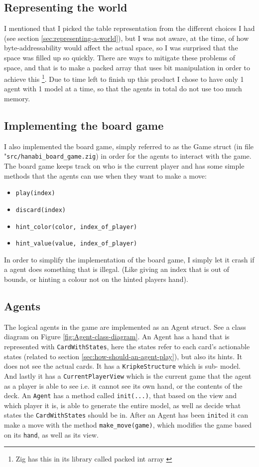 \subsection{Representing the world}
I mentioned that I picked the table representation from the different choices I had (see section \ref{sec:representing-a-world}), but I was not aware, at the time, of how byte-addressability would affect the actual space, so I was surprised that the space was filled up so quickly.
There are ways to mitigate these problems of space, and that is to make a packed array that uses bit manipulation in order to achieve this \footnote{Zig has this in its library called packed int array \cite{zigpackedintarr}}.
Due to time left to finish up this product I chose to have only 1 agent with 1 model at a time, so that the agents in total do not use too much memory.

\subsection{Implementing the board game}
I also implemented the board game, simply referred to as the Game struct (in file "{\tt src/hanabi\_board\_game.zig}) in order for the agents to interact with the game.
The board game keeps track on who is the current player and has some simple methods that the agents can use when they want to make a move:

\begin{itemize}
	\item {\tt play(index)}
	\item {\tt discard(index)}
	\item {\tt hint\_color(color, index\_of\_player) }
	\item {\tt hint\_value(value, index\_of\_player) }
\end{itemize}
In order to simplify the implementation of the board game, I simply let it crash if a agent does something that is illegal.
(Like giving an index that is out of bounds, or hinting a colour not on the hinted players hand).


\subsection{Agents}
The logical agents in the game are implemented as an Agent struct.
See a class diagram on Figure \ref{fig:Agent-class-diagram}.
An Agent has a hand that is represented with {\tt CardWithStates}, here the states refer to each card's actionable states (related to section \ref{sec:how-should-an-agent-play}), but also its hints.
It does not see the actual cards.
It has a {\tt KripkeStructure} which is sub-\SfiveN{} model.
And lastly it has a {\tt CurrentPlayerView} which is the current game that the agent as a player is able to see i.e. it cannot see its own hand, or the contents of the deck.
An {\tt Agent} has a method called {\tt init(...)}, that based on the view and which player it is, is able to generate the entire model, as well as decide what states the {\tt CardWithStates} should be in.
After an Agent has been {\tt init}ed it can make a move with the method {\tt make\_move(game)}, which modifies the game based on its {\tt hand}, as well as its view.

